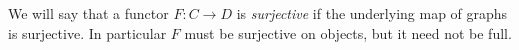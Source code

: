 \documentclass{amsbook} %
\newcommand{\ELnn}{E\Lambda(\underline{2n})}
\numberwithin{section}{chapter}
\begin{document}
%



\begin{Defi}
We will say that a functor $F: C \to D$ is \emph{surjective} if the underlying map of graphs is surjective. In particular $F$ must be surjective on objects, but it need not be full.
\end{Defi}
\end{document}
